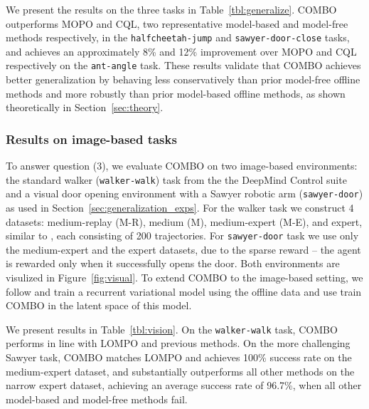 We present the results on the three tasks in Table~\ref{tbl:generalize}. COMBO outperforms MOPO and CQL, two representative model-based and model-free methods respectively, in the \texttt{halfcheetah-jump} and \texttt{sawyer-door-close} tasks, and achieves an approximately 8\% and 12\% improvement over MOPO and CQL respectively on the \texttt{ant-angle} task. These results validate that COMBO achieves better generalization by behaving less conservatively than prior model-free offline methods and more robustly than prior model-based offline methods, as shown theoretically in Section~\ref{sec:theory}.

\subsubsection{Results on image-based tasks}

To answer question (3), we evaluate COMBO on two image-based environments: the standard walker (\texttt{walker-walk}) task from the the DeepMind Control suite \cite{tassa2018deepmind} and a visual door opening environment with a Sawyer robotic arm (\texttt{sawyer-door}) as used in Section~\ref{sec:generalization_exps}. For the walker task we construct 4 datasets: medium-replay (M-R), medium (M), medium-expert (M-E), and expert, similar to \citet{fu2020d4rl}, each consisting of 200 trajectories. For \texttt{sawyer-door} task we use only the medium-expert and the expert datasets, due to the sparse reward -- the agent is rewarded only when it successfully opens the door. Both environments are visulized in Figure~\ref{fig:visual}. To extend COMBO to the image-based setting, we follow \citet{Rafailov2020LOMPO} and train a recurrent variational model using the offline data and use train COMBO in the latent space of this model.

We present results in Table~\ref{tbl:vision}. On the \texttt{walker-walk} task, COMBO performs in line with LOMPO and previous methods. On the more challenging Sawyer task, COMBO matches LOMPO and achieves 100\% success rate on the medium-expert dataset, and substantially outperforms all other methods on the narrow expert dataset, achieving an average success rate of 96.7\%, when all other model-based and model-free methods fail. 



